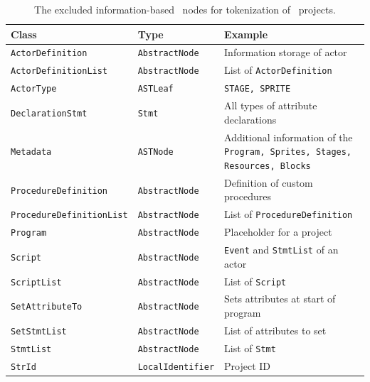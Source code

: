 \begin{table}[H]
    \caption[The excluded information-based \AST\ nodes]{\label{tab:excluded-metadata}The excluded information-based \AST\ nodes for tokenization of \scratch\ projects.}

    \begin{tabular}[t]{lll}
    	\toprule
    	Class & Type & Example \\
    	\midrule
    	\vspace{10pt}
    	    \texttt{ActorDefinition} & \texttt{AbstractNode} & Information storage of actor \\
    	    \vspace{10pt} 
    	    \texttt{ActorDefinitionList} & \texttt{AbstractNode} & List of \texttt{ActorDefinition} \\
    	    \vspace{10pt}
        \texttt{ActorType} & \texttt{ASTLeaf} & \texttt{STAGE, SPRITE} \\  
        \vspace{10pt}
        \texttt{DeclarationStmt} & \texttt{Stmt} & All types of attribute declarations\\
        \vspace{10pt}
        \texttt{Metadata} & \texttt{ASTNode} & \parbox[t]{7cm}{Additional information of the\\ \texttt{Program, Sprites, Stages, Resources, Blocks}} \\
        \vspace{10pt}
        \texttt{ProcedureDefinition} & \texttt{AbstractNode} & Definition of custom procedures \\
        \vspace{10pt}
        \texttt{ProcedureDefinitionList} & \texttt{AbstractNode} & List of \texttt{ProcedureDefinition} \\
        \vspace{10pt}
        \texttt{Program} & \texttt{AbstractNode} & Placeholder for a project\\
        \vspace{10pt}
        \texttt{Script} & \texttt{AbstractNode} & \texttt{Event} and \texttt{StmtList} of an actor \\  
        \vspace{10pt}
        \texttt{ScriptList} & \texttt{AbstractNode} & List of \texttt{Script} \\
        \vspace{10pt}
        \texttt{SetAttributeTo} & \texttt{AbstractNode} & Sets attributes at start of program \\
        \vspace{10pt} 
        \texttt{SetStmtList} & \texttt{AbstractNode} & List of attributes to set \\
        \vspace{10pt}
        \texttt{StmtList} & \texttt{AbstractNode} & List of \texttt{Stmt} \\
        \vspace{10pt}
        \texttt{StrId} & \texttt{LocalIdentifier} & Project ID \\            
    \bottomrule
    \end{tabular}
\end{table}

